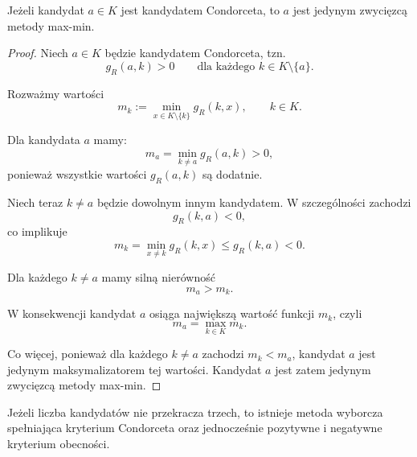 \documentclass[12pt,a4paper]{mwrep}
\begin{document}
	\begin{lemma}
		\label{lem:condorcet-minimax}
		Jeżeli kandydat \(a \in K\) jest kandydatem Condorceta, to \(a\) jest jedynym zwycięzcą metody max-min.
	\end{lemma}
	
	\begin{proof}
		Niech \(a \in K\) będzie kandydatem Condorceta, tzn.
		\[
		g_R(a,k) > 0 \qquad \text{dla każdego } k \in K \setminus \{a\}.
		\]
		
		Rozważmy wartości
		\[
		m_k := \min_{x \in K \setminus \{k\}} g_R(k,x),
		\qquad k \in K.
		\]
		
		Dla kandydata \(a\) mamy:
		\[
		m_a = \min_{k \neq a} g_R(a,k) > 0,
		\]
		ponieważ wszystkie wartości \(g_R(a,k)\) są dodatnie.
		
		Niech teraz \(k \neq a\) będzie dowolnym innym kandydatem. W szczególności zachodzi
		\[
		g_R(k,a) < 0,
		\]
		co implikuje
		\[
		m_k = \min_{x \neq k} g_R(k,x) \le g_R(k,a) < 0.
		\]
		
		Dla każdego \(k \neq a\) mamy silną nierówność
		\[
		m_a > m_k.
		\]
		
		W konsekwencji kandydat \(a\) osiąga największą wartość funkcji \(m_k\), czyli
		\[
		m_a = \max_{k \in K} m_k.
		\]
		
		Co więcej, ponieważ dla każdego \(k \neq a\) zachodzi \(m_k < m_a\), kandydat \(a\) jest jedynym maksymalizatorem tej wartości. Kandydat \(a\) jest zatem jedynym zwycięzcą metody max-min.
	\end{proof}

	\begin{theorem}
		Jeżeli liczba kandydatów nie przekracza trzech, to istnieje metoda wyborcza spełniająca kryterium Condorceta oraz jednocześnie pozytywne i negatywne kryterium obecności.
	\end{theorem}
	
\end{document}
